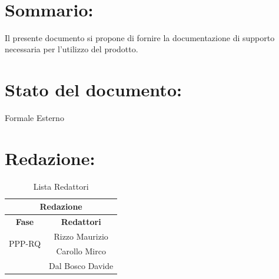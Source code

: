 \begin{center} %
	\begin{Huge}	
				\textbf{\TITOLODOC}
			\\
	\end{Huge}
\end{center}

\section*{\LARGE Sommario:}
Il presente documento si propone di fornire la documentazione di supporto necessaria per l'utilizzo del prodotto.

\indent \indent

\section*{\LARGE Stato del documento:}
\indent \indent
	Formale Esterno

\section*{\LARGE Redazione:}
	\begin{table}[!h]
		\begin{center}
			\begin{tabular}
				{|c|c|}
				\hline
				\multicolumn{2}{|c|}{ \textbf{Redazione} } \\
				\hline
				\textbf{Fase} & \textbf{Redattori} \\
				\hline
				\multirow{2}{*}{PPP-RQ} & Rizzo Maurizio\\
										& Carollo Mirco\\
										& Dal Bosco Davide\\
				\hline
			\end{tabular}
			\caption{Lista Redattori} %
			\label{tabredazione}
		\end{center}
	\end{table}
	
	
